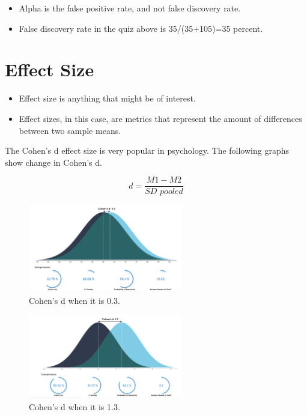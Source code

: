 \begin{itemize}
  \item Alpha is the false positive rate, and not false discovery rate.
  \item False discovery rate in the quiz above is 35/(35+105)=35 percent.
\end{itemize}

\newpage
\section{Effect Size}

\begin{itemize}
  \item Effect size is anything that might be of interest.
  \item Effect sizes, in this case, are metrics that represent the amount of differences between two sample means. \\
\end{itemize} 


The Cohen's d effect size is very popular in psychology. The following graphs show change in Cohen's d.


\begin{equation}
  d=\frac{M1-M2}{\textit{SD pooled}}
\end{equation}


\begin{figure}[ht]
  \begin{center}
    \includegraphics[width=0.6\textwidth]{figures/2.png}
    \caption{
      Cohen's d when it is 0.3.}
    \label{fig:example_figure}
  \end{center}
\end{figure}


\begin{figure}[ht]
  \begin{center}
    \includegraphics[width=0.6\textwidth]{figures/3.png}
    \caption{
      Cohen's d when it is 1.3.}
    \label{fig:example_figure}
  \end{center}
\end{figure}

